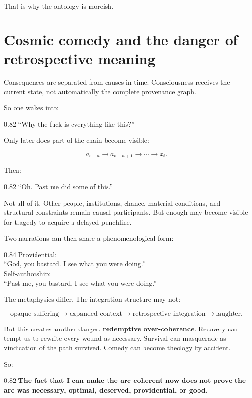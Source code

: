 \documentclass[10pt,letterpaper]{article}
\newenvironment{paperbody}
  {\begingroup\justifying}
  {\par\endgroup}
\newenvironment{voicebox}
  {\Needspace{3.5\baselineskip}\par\vspace{0.22em}\begin{center}\begingroup
   \begin{lrbox}{\voiceboxsave}\begin{varwidth}{0.82\linewidth}
   \small\rmfamily\upshape\RaggedRight}
  {\end{varwidth}\end{lrbox}\fbox{\usebox{\voiceboxsave}}
   \endgroup\end{center}\vspace{0.22em}}
\newenvironment{dialoguebox}
  {\Needspace{5\baselineskip}\par\vspace{0.26em}\begin{center}\begingroup
   \begin{lrbox}{\dialogueboxsave}\begin{varwidth}{0.84\linewidth}
   \small\rmfamily\upshape\RaggedRight}
  {\end{varwidth}\end{lrbox}\fbox{\usebox{\dialogueboxsave}}
   \endgroup\end{center}\vspace{0.26em}}
\let\oldsection\section
\renewcommand{\section}{\Needspace{6\baselineskip}\oldsection}
\begin{document}
\begin{paperbody}
That is why the ontology is moreish.

\section{Cosmic comedy and the danger of retrospective
meaning}\label{cosmic-comedy-and-the-danger-of-retrospective-meaning}

Consequences are separated from causes in time. Consciousness receives
the current state, not automatically the complete provenance graph.

So one wakes into:

\begin{voicebox}
``Why the fuck is everything like this?''
\end{voicebox}

Only later does part of the chain become visible:

\[
a_{t-n}\to a_{t-n+1}\to\cdots\to x_t.
\]

Then:

\begin{voicebox}
``Oh. Past me did some of this.''
\end{voicebox}

Not all of it. Other people, institutions, chance, material conditions,
and structural constraints remain causal participants. But enough may
become visible for tragedy to acquire a delayed punchline.

Two narrations can then share a phenomenological form:

\begin{dialoguebox}
Providential:\\
``God, you bastard. I see what you were doing.''\\[0.35em]
Self-authorship:\\
``Past me, you bastard. I see what you were doing.''
\end{dialoguebox}

The metaphysics differ. The integration structure may not:

\[
\text{opaque suffering}
\to
\text{expanded context}
\to
\text{retrospective integration}
\to
\text{laughter}.
\]

But this creates another danger: \textbf{redemptive over-coherence}.
Recovery can tempt us to rewrite every wound as necessary. Survival can
masquerade as vindication of the path survived. Comedy can become
theology by accident.

So:

\begin{voicebox}
\textbf{The fact that I can make the arc coherent now does not prove the
arc was necessary, optimal, deserved, providential, or good.}
\end{voicebox}


\end{paperbody}
\end{document}

